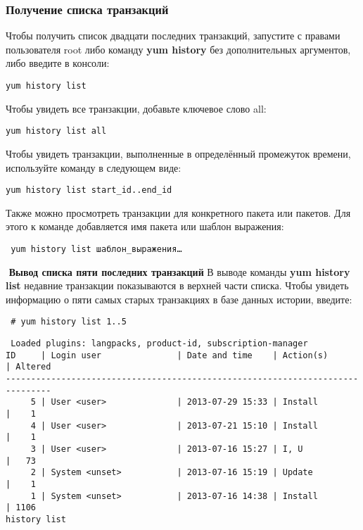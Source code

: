 \documentclass[a4paper,10pt,twoside]{article}
\begin{document}
\subsubsection{Получение списка транзакций}
Чтобы получить список двадцати последних транзакций, запустите с правами пользователя root либо команду \textbf{yum history} без дополнительных аргументов, либо введите в консоли:
\begin{verbatim}
yum history list
\end{verbatim} 

Чтобы увидеть все транзакции, добавьте ключевое слово all:
\begin{verbatim}
yum history list all
\end{verbatim} 
Чтобы увидеть транзакции, выполненные в определённый промежуток времени, используйте команду в следующем виде:
\begin{verbatim}
yum history list start_id..end_id
\end{verbatim} 

Также можно просмотреть транзакции для конкретного пакета или пакетов. Для этого к команде добавляется имя пакета или шаблон выражения:
\begin{verbatim}
 yum history list шаблон_выражения…
\end{verbatim} 
⁠
\textbf{Вывод списка пяти последних транзакций}
В выводе команды \textbf{yum history list} недавние транзакции показываются в верхней части списка. Чтобы увидеть информацию о пяти самых старых транзакциях в базе данных истории, введите:
\begin{verbatim}
 # yum history list 1..5
\end{verbatim} 
\begin{verbatim}
 Loaded plugins: langpacks, product-id, subscription-manager
ID     | Login user               | Date and time    | Action(s)      | Altered
-------------------------------------------------------------------------------
     5 | User <user>              | 2013-07-29 15:33 | Install        |    1
     4 | User <user>              | 2013-07-21 15:10 | Install        |    1
     3 | User <user>              | 2013-07-16 15:27 | I, U           |   73
     2 | System <unset>           | 2013-07-16 15:19 | Update         |    1
     1 | System <unset>           | 2013-07-16 14:38 | Install        | 1106
history list
\end{verbatim} 
\end{document}
